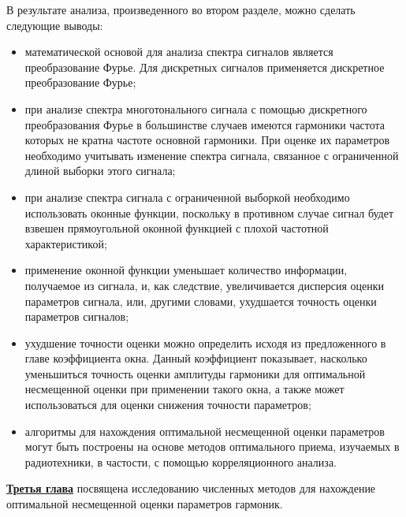 В результате анализа, произведенного во втором разделе, можно сделать следующие выводы:
\begin{itemize}
\item математической основой для анализа спектра сигналов является преобразование Фурье. Для дискретных сигналов применяется дискретное преобразование Фурье; 
	
\item при анализе спектра многотонального сигнала с помощью дискретного преобразования Фурье в большинстве случаев имеются гармоники частота которых не кратна частоте основной гармоники. При оценке их параметров необходимо учитывать изменение спектра сигнала, связанное с ограниченной длиной выборки этого сигнала;
	
\item при анализе спектра сигнала с ограниченной выборкой необходимо использовать оконные функции, поскольку в противном случае сигнал будет взвешен прямоугольной оконной функцией с плохой частотной характеристикой;
	
\item применение оконной функции уменьшает количество информации, получаемое из сигнала, и, как следствие, увеличивается дисперсия оценки параметров сигнала, или, другими словами, ухудшается точность оценки параметров сигналов;
	
\item ухудшение точности оценки можно определить исходя из предложенного в главе коэффициента окна. Данный коэффициент показывает, насколько уменьшиться точность оценки амплитуды гармоники для оптимальной несмещенной оценки при применении такого окна, а также может использоваться для оценки снижения точности параметров;
	
\item алгоритмы для нахождения оптимальной несмещенной оценки параметров могут быть построены на основе методов оптимального приема, изучаемых в радиотехники, в частости, с помощью корреляционного анализа.
\end{itemize}

\underline{\textbf{Третья глава}} посвящена исследованию численных методов для нахождение оптимальной несмещенной оценки параметров гармоник.

